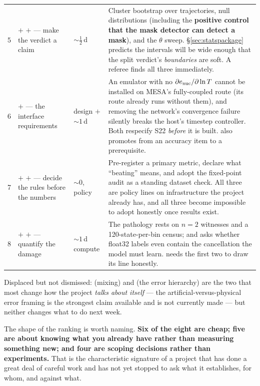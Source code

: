 \begin{longtable}{@{}L{0.5cm} L{4.0cm} L{1.9cm} L{8.4cm}@{}}
5 &  $+$  $+$  --- make the verdict a claim &
${\sim}\tfrac12$\,d &
Cluster bootstrap over trajectories, null distributions (including the
\textbf{positive control that the mask detector can detect a mask}), and the
$\theta$ sweep. \S\ref{sec:statspackage} predicts the intervals will be wide
enough that the split verdict's \emph{boundaries} are soft. A referee finds
all three immediately. \\

6 & \warnglyph{}  $+$  --- the interface requirements &
design $+$ ${\sim}1$\,d &
An emulator with no $\partial e_{\mathrm{nuc}}/\partial\ln T$ cannot be installed on
MESA's fully-coupled route (its  route already runs
without them), and removing the network's convergence failure silently breaks
the host's timestep controller. Both respecify S22 \emph{before} it is built.
 also promotes  from an accuracy item to a
prerequisite. \\

7 &  $+$  $+$  --- decide the rules before the
numbers & ${\sim}0$, policy &
Pre-register a primary metric, declare what ``beating'' means, and adopt the
fixed-point audit as a standing dataset check. All three are policy lines on
infrastructure the project already has, and all three become impossible to
adopt honestly once results exist. \\

8 &  $+$  $+$  --- quantify the damage &
${\sim}1$\,d compute &
The pathology rests on $n = 2$ witnesses and a 120-state-per-bin census; and
 asks whether float32 labels even contain the cancellation the
model must learn.  needs the first two to draw its line honestly. \\
\end{longtable}
\endgroup

Displaced but not dismissed:  (mixing) and  (the error
hierarchy) are the two that most change how the project \emph{talks about
itself} --- the artificial-versus-physical error framing is the strongest
claim available and is not currently made --- but neither changes what to do
next week.

The shape of the ranking is worth naming. \textbf{Six of the eight are cheap;
five are about knowing what you already have rather than measuring something
new; and four are scoping decisions rather than experiments.} That is the
characteristic signature of a project that has done a great deal of careful
work and has not yet stopped to ask what it establishes, for whom, and
against what.

